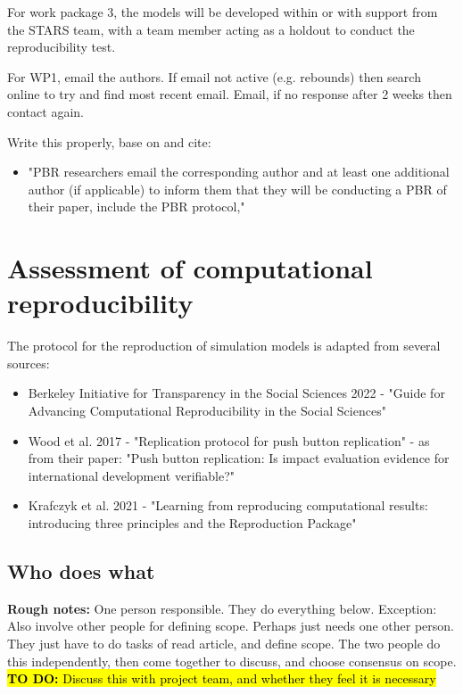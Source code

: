 For work package 3, the models will be developed within or with support from the STARS team, with a team member acting as a holdout to conduct the reproducibility test.

For WP1, email the authors. If email not active (e.g. rebounds) then search online to try and find most recent email. Email, if no response after 2 weeks then contact again.

Write this properly, base on and cite:
\begin{itemize}
    \item "PBR researchers email the corresponding author and at least one additional author (if applicable) to inform them that they will be conducting a PBR of their paper, include the PBR protocol,"\autocite{berkeley_initiative_for_transparency_in_the_social_sciences_guide_2022}
\end{itemize}

\section{Assessment of computational reproducibility}

The protocol for the reproduction of simulation models is adapted from several sources:
\begin{itemize}
    \item Berkeley Initiative for Transparency in the Social Sciences 2022 - "Guide for Advancing Computational Reproducibility in the Social Sciences"\autocite{berkeley_initiative_for_transparency_in_the_social_sciences_guide_2022}
    \item Wood et al. 2017 - "Replication protocol for push button replication"\autocite{wood_replication_2018} - as from their paper: "Push button replication: Is impact evaluation evidence for international development verifiable?"\autocite{wood_push_2018}
    \item Krafczyk et al. 2021 - "Learning from reproducing computational results: introducing three principles and the Reproduction Package"\autocite{krafczyk_learning_2021}
\end{itemize}

\subsection{Who does what}


\textbf{Rough notes:} One person responsible. They do everything below. Exception: Also involve other people for defining scope. Perhaps just needs one other person. They just have to do tasks of read article, and define scope. The two people do this independently, then come together to discuss, and choose consensus on scope. \hl{\textbf{TO DO:} Discuss this with project team, and whether they feel it is necessary}

